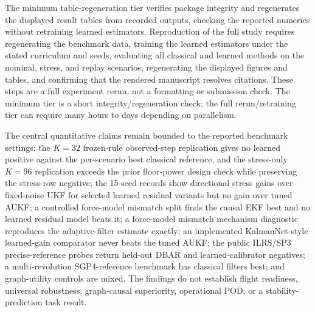 The minimum table-regeneration tier verifies package integrity and regenerates the displayed result tables from recorded outputs, checking the reported numerics without retraining learned estimators. Reproduction of the full study requires regenerating the benchmark data, training the learned estimators under the stated curriculum and seeds, evaluating all classical and learned methods on the nominal, stress, and replay scenarios, regenerating the displayed figures and tables, and confirming that the rendered manuscript resolves citations. These steps are a full experiment rerun, not a formatting or submission check. The minimum tier is a short integrity/regeneration check; the full rerun/retraining tier can require many hours to days depending on parallelism.

The central quantitative claims remain bounded to the reported benchmark settings: the $K=32$ frozen-rule observed-step replication gives no learned positive against the per-scenario best classical reference, and the stress-only $K=96$ replication exceeds the prior floor-power design check while preserving the stress-row negative; the 15-seed records show directional stress gains over fixed-noise UKF for selected learned residual variants but no gain over tuned AUKF; a controlled force-model mismatch split finds the causal EKF best and no learned residual model beats it; a force-model mismatch mechanism diagnostic reproduces the adaptive-filter estimate exactly; an implemented KalmanNet-style learned-gain comparator never beats the tuned AUKF; the public ILRS/SP3 precise-reference probes return held-out DBAR and learned-calibrator negatives; a multi-revolution SGP4-reference benchmark has classical filters best; and graph-utility controls are mixed. The findings do not establish flight readiness, universal robustness, graph-causal superiority, operational POD, or a stability-prediction task result.
